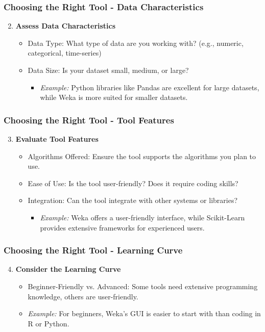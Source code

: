 \documentclass[aspectratio=169]{beamer}
\begin{document}
\begin{frame}[fragile]
    \frametitle{Choosing the Right Tool - Data Characteristics}
    \begin{enumerate}
        \setcounter{enumi}{1}
        \item \textbf{Assess Data Characteristics}
        \begin{itemize}
            \item Data Type: What type of data are you working with? (e.g., numeric, categorical, time-series)
            \item Data Size: Is your dataset small, medium, or large?
            \begin{itemize}
                \item \textit{Example:} Python libraries like Pandas are excellent for large datasets, while Weka is more suited for smaller datasets.
            \end{itemize}
        \end{itemize}
    \end{enumerate}
\end{frame}

\begin{frame}[fragile]
    \frametitle{Choosing the Right Tool - Tool Features}
    \begin{enumerate}
        \setcounter{enumi}{2}
        \item \textbf{Evaluate Tool Features}
        \begin{itemize}
            \item Algorithms Offered: Ensure the tool supports the algorithms you plan to use.
            \item Ease of Use: Is the tool user-friendly? Does it require coding skills?
            \item Integration: Can the tool integrate with other systems or libraries?
            \begin{itemize}
                \item \textit{Example:} Weka offers a user-friendly interface, while Scikit-Learn provides extensive frameworks for experienced users.
            \end{itemize}
        \end{itemize}
    \end{enumerate}
\end{frame}

\begin{frame}[fragile]
    \frametitle{Choosing the Right Tool - Learning Curve}
    \begin{enumerate}
        \setcounter{enumi}{3}
        \item \textbf{Consider the Learning Curve}
        \begin{itemize}
            \item Beginner-Friendly vs. Advanced: Some tools need extensive programming knowledge, others are user-friendly.
            \item \textit{Example:} For beginners, Weka's GUI is easier to start with than coding in R or Python.
        \end{itemize}
    \end{enumerate}
\end{frame}
\end{document}
